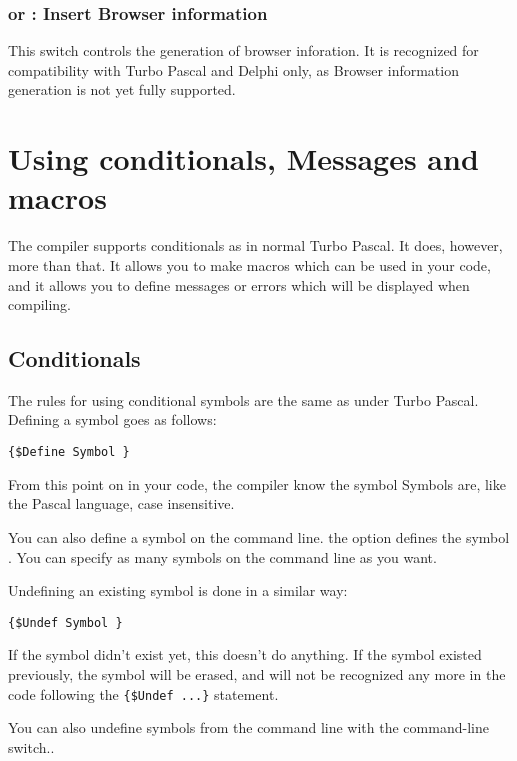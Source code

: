 \documentclass{report}
\begin{document}
\subsection{ or  : Insert Browser information}

This switch controls the generation of browser inforation. It is recognized
for compatibility with Turbo Pascal and Delphi only, as Browser information
generation is not yet fully supported.


\chapter{Using conditionals, Messages and macros}
\label{ch:CondMessageMacro}
The \fpc compiler supports conditionals as in normal Turbo Pascal. It does,
however, more than that. It allows you to make macros which can be used in
your code, and it allows you to define messages or errors which will be
displayed when compiling.

\section{Conditionals}
\label{se:Conditionals}
The rules for using conditional symbols are the same as under Turbo Pascal.
Defining a symbol goes as follows:
\begin{verbatim}
{$Define Symbol }
\end{verbatim}
From this point on in your code, the compiler know the symbol 
Symbols are, like the Pascal language, case insensitive.

You can also define a symbol on the command line. the  option
defines the symbol . You can specify as many symbols on the
command line as you want.

Undefining an existing symbol is done in a similar way:
\begin{verbatim}
{$Undef Symbol }
\end{verbatim}
If the symbol didn't exist yet, this doesn't do anything. If the symbol
existed previously, the symbol will be erased, and will not be recognized
any more in the code following the \verb|{$Undef ...}| statement.

You can also undefine symbols from the command line with the 
command-line switch..
\end{document}

